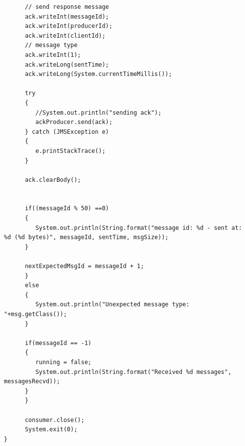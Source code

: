 \documentclass{thesis}
\begin{document}
\begin{lstlisting}
      // send response message
      ack.writeInt(messageId);
      ack.writeInt(producerId);
      ack.writeInt(clientId);
      // message type
      ack.writeInt(1);
      ack.writeLong(sentTime);
      ack.writeLong(System.currentTimeMillis());

      try 
      {
         //System.out.println("sending ack");
         ackProducer.send(ack);
      } catch (JMSException e) 
      {
         e.printStackTrace();
      }
    			
      ack.clearBody();
            	
            	
      if((messageId % 50) ==0)
      {
         System.out.println(String.format("message id: %d - sent at: %d (%d bytes)", messageId, sentTime, msgSize));
      }
            	
      nextExpectedMsgId = messageId + 1;
      }
      else 
      {
         System.out.println("Unexpected message type: "+msg.getClass());
      }
                          
      if(messageId == -1)
      {
         running = false;
         System.out.println(String.format("Received %d messages", messagesRecvd));
      }            
      }
        
      consumer.close();
      System.exit(0);    
}
\end{lstlisting}
\end{document}
